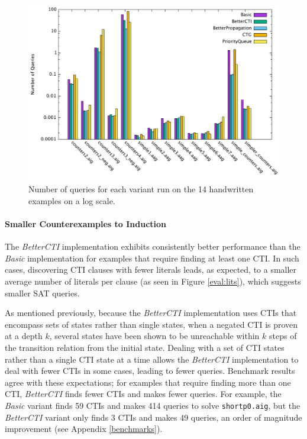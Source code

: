 \documentclass[12pt,a4paper,twoside,openright]{report}
\begin{document}
{{\begin{figure}[!ht]
\includegraphics[width=16cm]{numqueries.pdf}
\caption{Number of queries for each variant run on the 14 handwritten examples on a log scale.}
\label{eval:queries}
\end{figure}

\paragraph{Smaller Counterexamples to Induction}{
The \emph{BetterCTI} implementation exhibits consistently
better performance than the \emph{Basic} implementation for examples
that require finding at least one CTI. In such cases,
discovering CTI clauses with fewer literals leads, as expected, to a smaller average number of
literals per clause (as seen in Figure \ref{eval:lits}), which suggests smaller SAT queries.

As mentioned previously, because the \emph{BetterCTI} implementation uses
CTIs that encompass sets of states rather than single states, when a negated CTI is proven at a depth
$k$, several states have been shown to be unreachable within $k$ steps of the transition relation
from the initial state. Dealing with a set of CTI states rather than a single CTI state
at a time allows
the \emph{BetterCTI} implementation to deal with fewer CTIs in some cases,
leading to fewer queries.
Benchmark results
agree with these expectations; for examples that require finding more than one CTI, \emph{BetterCTI}
finds fewer CTIs and makes fewer queries.
For example, the \emph{Basic} variant finds 59 CTIs and makes 414 queries to solve
\verb,shortp0.aig,, but the \emph{BetterCTI} variant only finds 3 CTIs and makes 49 queries, an order of magnitude improvement (see Appendix \ref{benchmarks}). 

}}}
\end{document}
